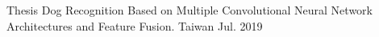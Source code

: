 

\begin{cventries}

  \cventry
    {Thesis} %
    {Dog Recognition Based on Multiple Convolutional Neural Network Architectures and Feature Fusion.}%
    {Taiwan} %
    {Jul. 2019} %
    {
    }

\end{cventries}
